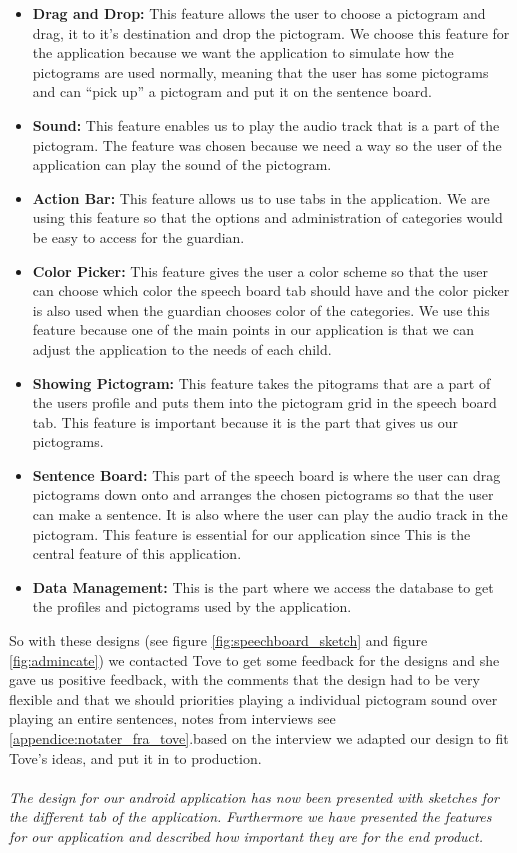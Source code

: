 \begin{itemize}
	\item \textbf{Drag and Drop:} This feature allows the user to choose a pictogram and drag, it to it's destination and drop the pictogram.  We choose this feature for the application because we want the application to simulate how the pictograms are used normally, meaning that the user has some pictograms and can ``pick up'' a pictogram and put it on the sentence board.  
	\item \textbf{Sound:} This feature enables us to play the audio track that is a part of the pictogram. The feature was chosen because we need a way so the user of the application can play the sound of the pictogram. 
	\item \textbf{Action Bar:} This feature allows us to use tabs in the application. We are using this feature so that the options and administration of categories would be easy to access for the guardian. 
	\item \textbf{Color Picker:} This feature gives the user a color scheme so that the user can choose which color the speech board tab should have and the color picker is also used when the guardian chooses color of the categories. We use this feature because one of the main points in our application is that we can adjust the application to the needs of each child. 
	\item \textbf{Showing Pictogram:} This feature takes the pitograms that are a part of the users profile and puts them into the pictogram grid in the speech board tab. This feature is important because it is the part that gives us our pictograms. 
	\item \textbf{Sentence Board:} This part of the speech board is where the user can drag pictograms down onto and arranges the chosen pictograms so that the user can make a sentence. It is also where the user can play the audio track in the pictogram. This feature is essential for our application since This is the central feature of this application. 
	\item \textbf{Data Management:} This is the part where we access the database to get the profiles and pictograms used by the application.
\end{itemize}

So with these designs (see figure \ref{fig:speechboard_sketch} and figure \ref{fig:admincate}) we contacted Tove to get some feedback for the designs and she gave us positive  feedback, with the comments that the design had to be very flexible and that we should priorities playing a individual pictogram sound over playing an entire sentences, notes from interviews see \autoref{appendice:notater_fra_tove}.based on the interview we adapted our design to fit Tove's ideas, and put it in to production.\\  
\\
\textit{The design for our android application has now been presented with sketches for the different tab of the application. Furthermore we have presented the features for our application and described how important they are for the end product.} 